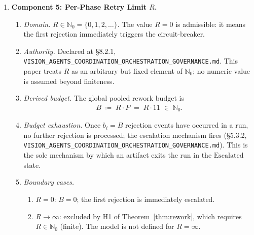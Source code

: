 \documentclass[12pt]{article}
\theoremstyle{definition}
\newcommand{\code}[1]{\texttt{#1}}
\newcommand{\VisionGov}{\code{VISION\_AGENTS\_\allowbreak COORDINATION\_\allowbreak ORCHESTRATION\_\allowbreak GOVERNANCE.md}}
\begin{document}
\begin{enumerate}
  \item \textbf{Component 5: Per-Phase Retry Limit $R$.}
  \begin{enumerate}
    \item[5.1] \emph{Domain.}
               $R \in \mathbb{N}_0 = \{0,1,2,\ldots\}$.
               The value $R = 0$ is admissible: it means the first
               rejection immediately triggers the circuit-breaker.
    \item[5.2] \emph{Authority.}
               Declared at \S8.2.1, \VisionGov{}.
               This paper treats $R$ as an arbitrary but fixed element
               of $\mathbb{N}_0$; no numeric value is assumed beyond
               finiteness.
    \item[5.3] \emph{Derived budget.}
               The global pooled rework budget is
               \begin{align}
                 B \;\coloneqq\; R \cdot P
                 \;=\; R \cdot 11
                 \;\in\; \mathbb{N}_0.
                 \label{eq:B-def}
               \end{align}
    \item[5.4] \emph{Budget exhaustion.}
               Once $b_i = B$ rejection events have occurred in a run,
               no further rejection is processed; the escalation
               mechanism fires (\S5.3.2, \VisionGov{}).
               This is the sole mechanism by which an artifact exits
               the run in the $\mathrm{Escalated}$ state.
    \item[5.5] \emph{Boundary cases.}
               \begin{enumerate}
                 \item[(a)] $R = 0$: $B = 0$; the first rejection is
                            immediately escalated.
                 \item[(b)] $R \to \infty$: excluded by H1 of
                            Theorem~\ref{thm:rework}, which requires
                            $R \in \mathbb{N}_0$ (finite).  The model
                            is not defined for $R = \infty$.
               \end{enumerate}
  \end{enumerate}


\end{enumerate}
\end{document}
